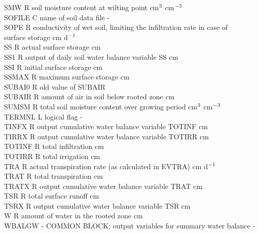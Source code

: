 \begin{tabbing}
SMW\> \> R\> soil moisture content at wilting point\> \> \> \> \> \> \> cm$^{{\rm 3}}$ cm$^{{\rm -3}}$\\
SOFILE\> \> C\> name of soil data file\> \> \> \> \> \> \> -\\
SOPE\> \> R\> conductivity of wet soil, limiting the infiltration rate in case of \\
\>\> \> surface storage \> \> \> \> \> \> \> cm d$^{{\rm -1}}$\\
SS\> \> R\> actual surface storage\> \> \> \> \> \> \> cm\\
SS1\> \> R\> output of daily soil water balance variable SS\> \> \> \> \> \> \> cm\\
SSI\> \> R\> initial surface storage\> \> \> \> \> \> \> cm\\
SSMAX\> \> R\> maximum surface storage\> \> \> \> \> \> \> cm\\
SUBAI0\> \> R\> old value of SUBAIR\\
SUBAIR\> \> R\> amount of air in soil below rooted zone\> \> \> \> \> \> \> cm\\
SUMSM\> \> R\> total soil moisture content over growing period \> \> \> \> \> \> \> cm$^{{\rm 3}}$ cm$^{{\rm -3}}$\\
TERMNL\> \> L\> logical flag\> \> \> \> \> \> \> -\\
TINFX\> \> R\> output cumulative water balance variable TOTINF\> \> \> \> \> \> \> cm\\
TIRRX\> \> R\> output cumulative water balance variable TOTIRR\> \> \> \> \> \> \> cm\\
TOTINF\> \> R\> total infiltration\> \> \> \> \> \> \> cm\\
TOTIRR\> \> R\> total irrigation\> \> \> \> \> \> \> cm\\
TRA\> \> R\> actual transpiration rate (as calculated in EVTRA)\> \> \> \> \> \> \> cm d$^{{\rm -1}}$\\
TRAT\> \> R\> total transpiration\> \> \> \> \> \> \> cm\\
TRATX\> \> R\> output cumulative water balance variable TRAT\> \> \> \> \> \> \> cm\\
TSR\> \> R\> total surface runoff\> \> \> \> \> \> \> cm\\
TSRX\> \> R\> output cumulative water balance variable TSR\> \> \> \> \> \> \> cm\\
W\> \> R\> amount of water in the rooted zone\> \> \> \> \> \> \> cm\\
WBALGW\> \> -\> COMMON BLOCK; output variables for summary water balance\> \> \> \> \> \> \> -\\

\end{tabbing}
